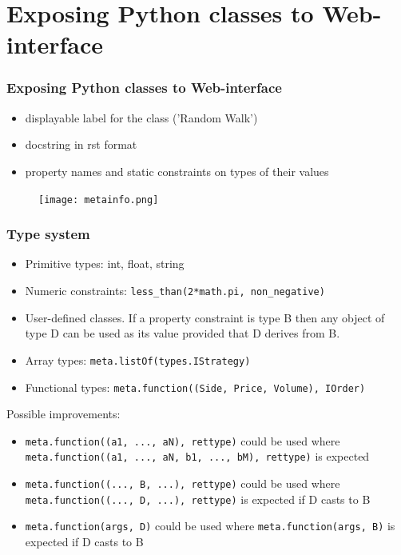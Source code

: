 \documentclass{beamer}
\begin{document}
\section{Exposing Python classes to Web-interface}
\begin{frame}
\frametitle{Exposing Python classes to Web-interface}
\begin{itemize}
  \item displayable label for the class ('Random Walk')
  \item docstring in rst format
  \item property names and static constraints on types of their values
\end{itemize}
\begin{figure}[htbp]
\centering
\texttt{[image: metainfo.png]}
\end{figure}
\end{frame}

\begin{frame}
\frametitle{Type system}
\begin{itemize}
  \item Primitive types: int, float, string
  \item Numeric constraints: \texttt{less\_than(2*math.pi, non\_negative)}
  \item User-defined classes. If a property constraint is type B then any object of type D can be used as its value provided that D derives from B.
  \item Array types: \texttt{meta.listOf(types.IStrategy)}
  \item Functional types: \texttt{meta.function((Side, Price, Volume), IOrder)}
\end{itemize}
Possible improvements:
\begin{itemize}
  \item \texttt{meta.function((a1, ..., aN), rettype)} could be used where \texttt{meta.function((a1, ..., aN, b1, ..., bM), rettype)} is expected
  \item \texttt{meta.function((..., B, ...), rettype)} could be used where \texttt{meta.function((..., D, ...), rettype)} is expected if D casts to B
  \item \texttt{meta.function(args, D)} could be used where \texttt{meta.function(args, B)} is expected if D casts to B
\end{itemize}
\end{frame}
\end{document}
